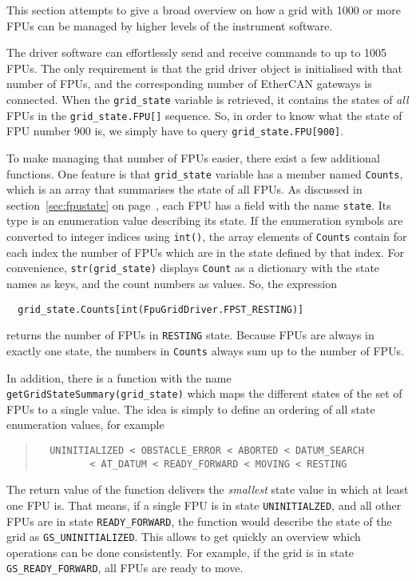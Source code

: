 \documentclass{scrartcl}[12pt,a4paper]
\begin{document}
This section attempts to give a broad overview on how a grid with 1000
or more FPUs can be managed by higher levels of the instrument
software.

The driver software can effortlessly send and receive commands to up
to 1005 FPUs. The only requirement is that the grid driver object is
initialised with that number of FPUs, and the corresponding number of
EtherCAN gateways is connected. When the \texttt{grid\_state} variable
is retrieved, it contains the states of \emph{all} FPUs in the
\verb+grid_state.FPU[]+ sequence. So, in order to know what the state
of FPU number 900 is, we simply have to query
\verb+grid_state.FPU[900]+.

To make managing that number of FPUs easier, there exist a few
additional functions. One feature is that \texttt{grid\_state}
variable has a member named \texttt{Counts}, which is an array that
summarises the state of all FPUs. As discussed in
section~\ref{sec:fpustate} on page~\pageref{sec:fpustate}, each FPU
has a field with the name \texttt{state}. Its type is an enumeration
value describing its state. If the enumeration symbols are converted
to integer indices using \texttt{int()}, the array elements of
\texttt{Counts} contain for each index the number of FPUs which are in
the state defined by that index. For convenience,
\texttt{str(grid\_state)} displays \texttt{Count} as a dictionary with
the state names as keys, and the count numbers as values. So, the
expression
\begin{verbatim}
  grid_state.Counts[int(FpuGridDriver.FPST_RESTING)]
\end{verbatim}
returns the number of FPUs in \texttt{RESTING} state. Because FPUs are
always in exactly one state, the numbers in \texttt{Counts} always sum
up to the number of FPUs.

In addition, there is a function with the name
\texttt{getGridStateSummary(grid\_state)} which maps the different
states of the set of FPUs to a single value. The idea is simply to
define an ordering of all state enumeration values, for example
\begin{quote}
\begin{verbatim}
  UNINITIALIZED < OBSTACLE_ERROR < ABORTED < DATUM_SEARCH
         < AT_DATUM < READY_FORWARD < MOVING < RESTING
\end{verbatim}
\end{quote}

The return value of the function delivers the \emph{smallest} state
value in which at least one FPU is.  That means, if a single FPU is in
state \texttt{UNINITIALZED}, and all other FPUs are in state
\texttt{READY\_FORWARD}, the function would describe the state of the
grid as \texttt{GS\_UNINITIALIZED}. This allows to get quickly an
overview which operations can be done consistently. For example, if
the grid is in state \texttt{GS\_READY\_FORWARD}, all FPUs are ready
to move.
\end{document}
